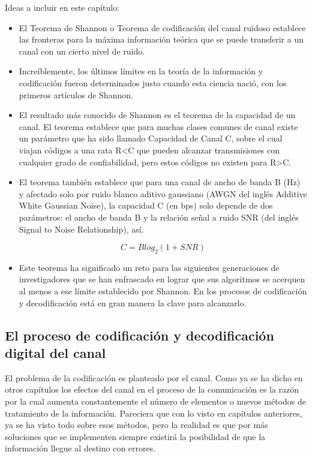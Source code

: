 Ideas a incluir en este capítulo:
\begin{itemize}
    \item El Teorema de Shannon o Teorema de codificación del canal ruidoso establece las fronteras para la máxima información teórica que se puede transferir a un canal con un cierto nivel de ruido. 
    \item Increíblemente, los últimos límites en la teoría de la información y codificación fueron determinados justo cuando esta ciencia nació, con los primeros artículos de Shannon.
    \item El resultado más conocido de Shannon es el teorema de la capacidad de un canal. El teorema establece que para muchas clases comunes de canal existe un parámetro que ha sido llamado Capacidad de Canal C, sobre el cual viajan códigos a una rata R<C que pueden alcanzar transmisiones con cualquier grado de confiabilidad, pero estos códigos no existen para R>C.
    \item El teorema también establece que para una canal de ancho de banda B (Hz) y afectado solo por ruido blanco aditivo gaussiano (AWGN del inglés Additive White Gaussian Noise), la capacidad C (en bps) solo depende de dos parámetros: el ancho de banda B y la relación señal a ruido SNR (del inglés Signal to Noise Relationship), así. 
    
    \begin{equation} \label{capsiete_siete}
   C = Blog_{2}(1+ SNR)
    \end{equation}
    
    \item Este teorema ha significado un reto para las siguientes generaciones de investigadores que se han enfrascado en lograr que sus algoritmos se acerquen al menos a ese límite establecido por Shannon. En los procesos de codificación y decodificación está en gran manera la clave para alcanzarlo. 
\end{itemize}

\subsection{El proceso de codificación y decodificación digital del canal}

El problema de la codificación es planteado por el canal. Como ya  se ha dicho en otros capítulos los efectos del canal en el proceso de la comunicación es la razón por la cual aumenta constantemente el número de elementos o nuevos métodos de tratamiento de la información. Pareciera que con lo visto en capítulos anteriores, ya se ha visto todo sobre esos métodos, pero la realidad es que por más soluciones que se implementen siempre existirá la posibilidad de que la información llegue al destino con errores.


